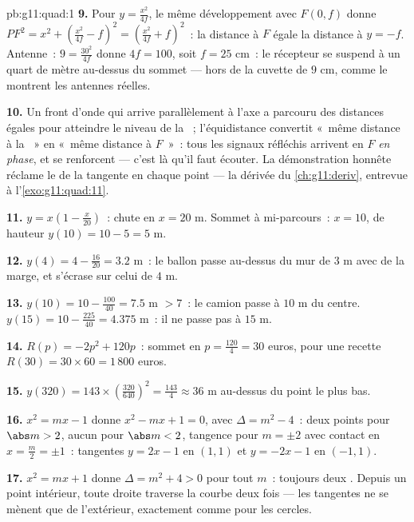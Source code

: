 \begin{solution}{pb:g11:quad:1}
\textbf{9.} Pour $y = \frac{x^2}{4f}$, le même développement avec
$F(0, f)$ donne $PF^2 = x^2 + \left(\frac{x^2}{4f} - f\right)^2
= \left(\frac{x^2}{4f} + f\right)^2$~: la distance à $F$ égale la
distance à $y = -f$. Antenne~: $9 = \frac{30^2}{4f}$ donne
$4f = 100$, soit $f = 25$ cm~: le récepteur se suspend à un quart de
mètre au-dessus du sommet --- hors de la cuvette de $9$ cm, comme le
montrent les antennes réelles.

\textbf{10.} Un front d'onde qui arrive parallèlement à l'axe a
parcouru des distances égales pour atteindre le niveau de la
~; l'équidistance convertit «~même distance à la
~» en «~même distance à $F$~»~: tous les signaux
réfléchis arrivent en $F$ \emph{en phase}, et se renforcent --- c'est
là qu'il faut écouter. La démonstration honnête réclame le
 de la tangente en chaque point --- la dérivée
du \cref{ch:g11:deriv}, entrevue à l'\cref{exo:g11:quad:11}.

\textbf{11.} $y = x\left(1 - \frac{x}{20}\right)$~: chute en
$x = 20$ m. Sommet à mi-parcours~: $x = 10$, de hauteur
$y(10) = 10 - 5 = 5$ m.

\textbf{12.} $y(4) = 4 - \frac{16}{20} = 3.2$ m~: le ballon passe
au-dessus du mur de $3$ m avec de la marge, et s'écrase sur celui de
$4$ m.

\textbf{13.} $y(10) = 10 - \frac{100}{40} = 7.5$ m $> 7$~: le camion
passe à $10$ m du centre. $y(15) = 10 - \frac{225}{40} = 4.375$ m~:
il ne passe pas à $15$ m.

\textbf{14.} $R(p) = -2p^2 + 120p$~: sommet en
$p = \frac{120}{4} = 30$ euros, pour une recette
$R(30) = 30 \times 60 = 1\,800$ euros.

\textbf{15.} $y(320) = 143 \times \left(\frac{320}{640}\right)^2
= \frac{143}{4} \approx 36$ m au-dessus du point le plus bas.

\textbf{16.} $x^2 = mx - 1$ donne $x^2 - mx + 1 = 0$, avec
$\Delta = m^2 - 4$~: deux points pour $\abs m > 2$, aucun pour
$\abs m < 2$, tangence pour $m = \pm 2$ avec contact en
$x = \frac m2 = \pm 1$~: tangentes $y = 2x - 1$ en $(1, 1)$ et
$y = -2x - 1$ en $(-1, 1)$.

\textbf{17.} $x^2 = mx + 1$ donne $\Delta = m^2 + 4 > 0$ pour tout
$m$~: toujours deux . Depuis un point intérieur, toute
droite traverse la courbe deux fois --- les tangentes ne se mènent
que de l'extérieur, exactement comme pour les cercles.


\end{solution}
